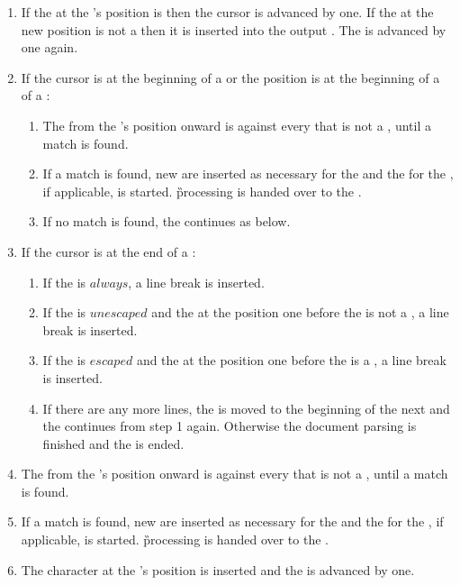 \begin{enumerate}
\item If the  at the 's position is  then the cursor is advanced by one. If the  at the new position is not a  then it is inserted into the output . The  is advanced by one again.
\item If the cursor is at the beginning of a  or the position is at the beginning of a  of a :
  \begin{enumerate}
  \item The  from the 's position onward is  against every  that is not a , until a match is found.
  \item If a match is found, new  are inserted as necessary for the  and the  for the , if applicable, is started. \G{processing} is handed over to the .
  \item If no match is found, the  continues as below.
  \end{enumerate}
\item If the cursor is at the end of a :
  \begin{enumerate}
  \item If the  is \inline$always$, a line break is inserted.
  \item If the  is \inline$unescaped$ and the  at the position one before the  is not a , a line break is inserted.
  \item If the  is \inline$escaped$ and the  at the position one before the  is a , a line break is inserted.
  \item If there are any more lines, the  is moved to the beginning of the next  and the  continues from step 1 again. Otherwise the document parsing is finished and the   is ended.
  \end{enumerate}
\item The  from the 's position onward is  against every  that is not a , until a match is found.
\item If a match is found, new  are inserted as necessary for the  and the  for the , if applicable, is started. \G{processing} is handed over to the .
\item The character at the 's position is inserted and the  is advanced by one.
\end{enumerate}

